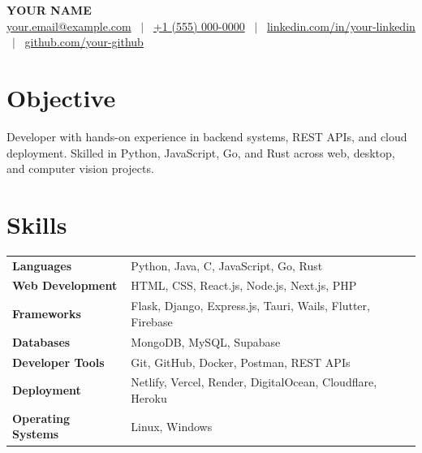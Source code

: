 \documentclass[a4paper,10pt]{article}
\begin{document}
\pagestyle{empty}

\begin{center}
{\LARGE \textbf{YOUR NAME}}\\[3pt]
\href{mailto:your.email@example.com}{your.email@example.com}
~$|$~
\href{tel:+910000085302}{+1 (555) 000-0000}
~$|$~
\href{https://www.linkedin.com/in/your-linkedin/}{linkedin.com/in/your-linkedin}
~$|$~
\href{https://github.com/your-github}{github.com/your-github}
\end{center}

\vspace{-5pt}

\section*{Objective}

Developer with hands-on experience in backend systems, REST APIs, and cloud deployment. Skilled in Python, JavaScript, Go, and Rust across web, desktop, and computer vision projects.

\section*{Skills}

\renewcommand{\arraystretch}{1.05}
\begin{tabular}{@{} >{\bfseries}p{3.8cm} p{13cm} @{}}
Languages           & Python, Java, C, JavaScript, Go, Rust \\
Web Development     & HTML, CSS, React.js, Node.js, Next.js, PHP \\
Frameworks          & Flask, Django, Express.js, Tauri, Wails, Flutter, Firebase \\
Databases           & MongoDB, MySQL, Supabase \\
Developer Tools     & Git, GitHub, Docker, Postman, REST APIs \\
Deployment          & Netlify, Vercel, Render, DigitalOcean, Cloudflare, Heroku \\
Operating Systems   & Linux, Windows \\
\end{tabular}
\end{document}
